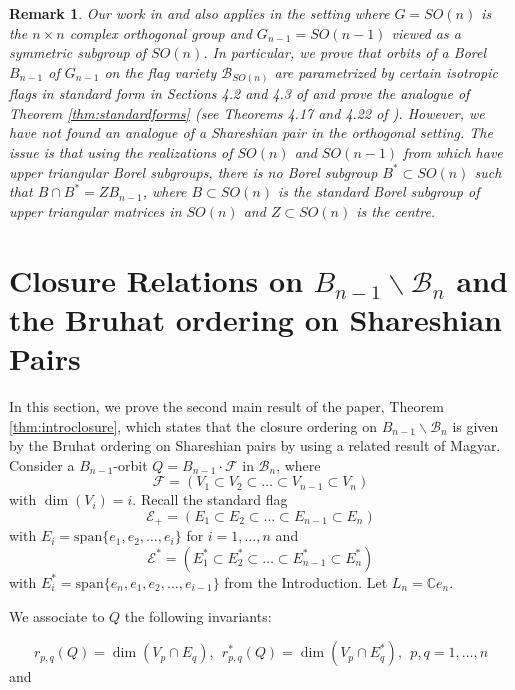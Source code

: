 \documentclass[12pt]{amsart}
\numberwithin{equation}{section}
\newtheorem{rem}[thm]{Remark}
\newcommand{\C}{\mbox{${\mathbb C}$}}
\newcommand{\B}{\mathcal{B}}
\newcommand{\F}{\mathcal{F}}
\newcommand{\Borbitspace}{B_{n-1}\backslash\B_{n}}
\begin{document}



\begin{rem}\label{r:orthocase}
Our work in \cite{CE21I} and \cite{CE21II} also applies in the setting where 
$G=SO(n)$ is the $n\times n$ complex orthogonal group and $G_{n-1}=SO(n-1)$ viewed as a symmetric subgroup of $SO(n)$.  In particular, we prove that orbits of a Borel $B_{n-1}$ of $G_{n-1}$ on the flag variety $\B_{SO(n)}$ are parametrized by certain isotropic flags in standard form
%
%
in Sections 4.2 and 4.3 of \cite{CE21II} and prove the analogue of Theorem \ref{thm:standardforms}
 (see Theorems 4.17 and 4.22 of \cite{CE21II}).  However, we have not found an analogue of a Shareshian pair in the orthogonal setting.  The issue is that using the realizations of $SO(n)$ and $SO(n-1)$ from \cite{CE21II} which have upper triangular Borel subgroups, there is no Borel subgroup $B^{*}\subset SO(n)$ such that $B\cap B^{*}=ZB_{n-1}$, where $B\subset SO(n)$ is the standard Borel subgroup of upper triangular matrices in $SO(n)$ and $Z\subset SO(n)$ is the centre.  
\end{rem}

\section{Closure Relations on $\Borbitspace$ and the Bruhat ordering on Shareshian Pairs}\label{s:closure}

In this section, we prove the second main result of the paper, Theorem \ref{thm:introclosure}, which states that the closure ordering on $\Borbitspace$ is given by the Bruhat ordering on Shareshian pairs by using a related result of Magyar.  
Consider a $B_{n-1}$-orbit $Q=B_{n-1}\cdot \F$ in $\B_n$, where
 $$
  \mathcal{F}=(V_{1}\subset V_{2}\subset\dots\subset V_{n-1} \subset V_n)
   $$
with $\dim(V_i)=i.$
Recall the standard flag $$\mathcal{E}_+=(E_1\subset E_2 \subset \dots \subset E_{n-1} \subset E_n)$$ with $E_{i}=\mbox{span}\{ e_1, e_2, \dots, e_i\}$ for $i=1, \dots, n$ and $$\mathcal{E}^{*}=(E_1^*\subset E_2^* \subset \dots \subset E_{n-1}^* \subset E_n^*)$$ with $E_i^*=\mbox{span}\{ e_n, e_1, e_2, \dots, e_{i-1}\}$ from the Introduction.  Let $L_n = \C e_n.$

We associate to $Q$ the following invariants:

\begin{equation}\label{eq:rpqandstar}
r_{p,q}(Q)=\dim(V_p\cap E_q), \ \ r^*_{p,q}(Q)=\dim(V_p \cap E_q^*), \ \ p, q=1, \dots, n
\end{equation}
and 
\end{document}
